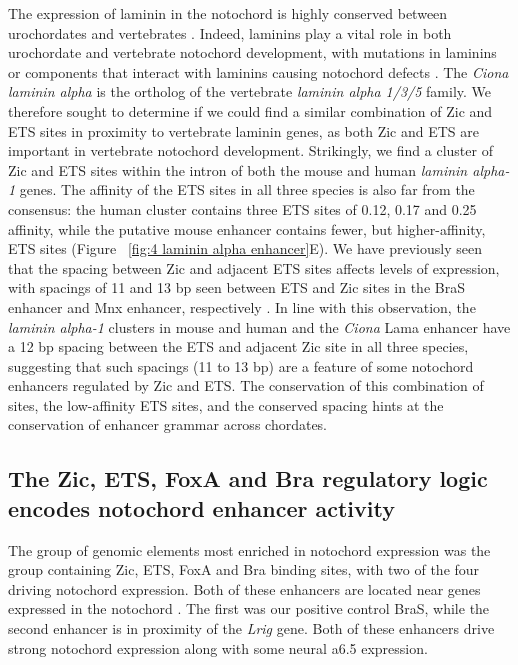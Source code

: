The expression of laminin in the notochord is highly conserved between urochordates and vertebrates \cite{reeves2017,scott2004,veeman2008}. Indeed, laminins play a vital role in both urochordate and vertebrate notochord development, with mutations in laminins or components that interact with laminins causing notochord defects \cite{machingo2006,parsons2002,pollard2006}. The \textit{Ciona} \textit{laminin alpha} is the ortholog of the vertebrate \textit{laminin alpha 1/3/5} family. We therefore sought to determine if we could find a similar combination of Zic and ETS sites in proximity to vertebrate laminin genes, as both Zic \cite{dykes2018,warr2008} and ETS \cite{barnett1998,olivera-martinez2012} are important in vertebrate notochord development. Strikingly, we find a cluster of Zic and ETS sites within the intron of both the mouse and human \textit{laminin alpha-1} genes. The affinity of the ETS sites in all three species is also far from the consensus: the human cluster contains three ETS sites of 0.12, 0.17 and 0.25 affinity, while the putative mouse enhancer contains fewer, but higher-affinity, ETS sites (Figure ~\ref{fig:4 laminin alpha enhancer}E). We have previously seen that the spacing between Zic and adjacent ETS sites affects levels of expression, with spacings of 11 and 13 bp seen between ETS and Zic sites in the BraS enhancer and Mnx enhancer, respectively \cite{farley2016}. In line with this observation, the \textit{laminin alpha-1} clusters in mouse and human and the \textit{Ciona} Lama enhancer have a 12 bp spacing between the ETS and adjacent Zic site in all three species, suggesting that such spacings (11 to 13 bp) are a feature of some notochord enhancers regulated by Zic and ETS. The conservation of this combination of sites, the low-affinity ETS sites, and the conserved spacing hints at the conservation of enhancer grammar across chordates.

\subsection{The Zic, ETS, FoxA and Bra regulatory logic encodes notochord enhancer activity}

The group of genomic elements most enriched in notochord expression was the group containing Zic, ETS, FoxA and Bra binding sites, with two of the four driving notochord expression. Both of these enhancers are located near genes expressed in the notochord \cite{reeves2017}. The first was our positive control BraS, while the second enhancer is in proximity of the \textit{Lrig} gene. Both of these enhancers drive strong notochord expression along with some neural a6.5 expression. 

